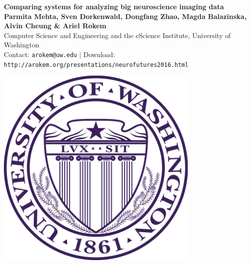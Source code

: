 \documentclass[a0,landscape]{a0poster}
\begin{document}


\begin{minipage}[b]{0.85\linewidth}
\veryHuge \color{NavyBlue} \textbf{Comparing systems for analyzing big neuroscience imaging data} \color{Black}\\ %
\huge \textbf{Parmita Mehta, Sven Dorkenwald, Dongfang Zhao, Magda Balazinska, Alvin Cheung \& Ariel Rokem}\\ %
\Large Computer Science and Engineering and the eScience Institute, University of Washington \\ %
\Large Contact: \texttt{arokem@uw.edu} $|$ Download: \texttt{http://arokem.org/presentations/neurofutures2016.html}
\end{minipage}
%
%
\begin{minipage}[b]{0.19\linewidth}
\includegraphics[width=10cm]{UWlogo.png}
\end{minipage}
\end{document}
